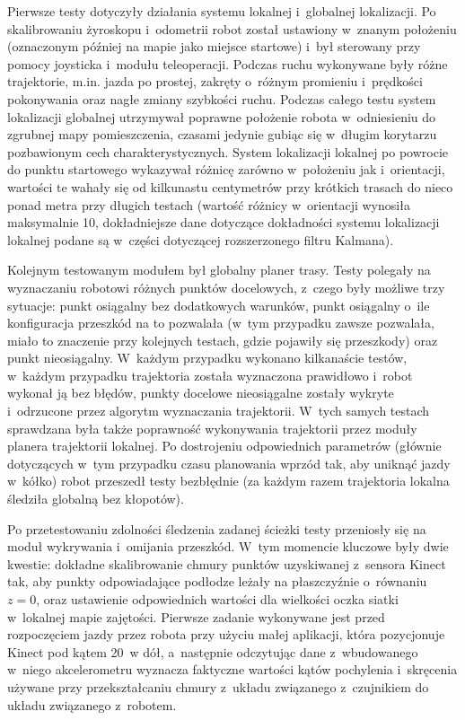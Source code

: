 Pierwsze testy dotyczyły działania systemu lokalnej i~globalnej lokalizacji.
Po skalibrowaniu żyroskopu i~odometrii robot został ustawiony w~znanym położeniu
(oznaczonym później na mapie jako miejsce startowe) i~był sterowany przy pomocy
joysticka i~modułu teleoperacji. Podczas ruchu wykonywane były różne trajektorie,
m.in. jazda po prostej, zakręty o~różnym promieniu i~prędkości pokonywania
oraz nagłe zmiany szybkości ruchu. Podczas całego testu system lokalizacji 
globalnej utrzymywał poprawne położenie robota w~odniesieniu do zgrubnej mapy 
pomieszczenia, czasami jedynie gubiąc się w~długim korytarzu pozbawionym 
cech charakterystycznych. System lokalizacji lokalnej po powrocie do punktu 
startowego wykazywał różnicę zarówno w~położeniu jak i~orientacji, wartości
te wahały się od kilkunastu centymetrów przy krótkich trasach do nieco ponad
metra przy długich testach (wartość różnicy w~orientacji wynosiła maksymalnie 10\textdegree,
dokładniejsze dane dotyczące dokładności systemu lokalizacji lokalnej podane
są w~części dotyczącej rozszerzonego filtru Kalmana).

Kolejnym testowanym modułem był globalny planer trasy. Testy polegały na 
wyznaczaniu robotowi różnych punktów docelowych, z~czego były możliwe 
trzy sytuacje: punkt osiągalny bez dodatkowych warunków, punkt osiągalny 
o~ile konfiguracja przeszkód na to pozwalała (w~tym przypadku zawsze pozwalała, 
miało to znaczenie przy kolejnych testach, gdzie pojawiły się przeszkody) 
oraz punkt nieosiągalny. W~każdym przypadku wykonano kilkanaście testów,
w~każdym przypadku trajektoria została wyznaczona prawidłowo i~robot wykonał
ją bez błędów, punkty docelowe nieosiągalne zostały wykryte i~odrzucone przez 
algorytm wyznaczania trajektorii. W~tych samych testach sprawdzana była także
poprawność wykonywania trajektorii przez moduły planera trajektorii lokalnej.
Po dostrojeniu odpowiednich parametrów (głównie dotyczących w~tym przypadku
czasu planowania wprzód tak, aby uniknąć jazdy w~kółko) robot przeszedł
testy bezbłędnie (za każdym razem trajektoria lokalna śledziła globalną 
bez kłopotów). 

Po przetestowaniu zdolności śledzenia zadanej ścieżki testy przeniosły się
na moduł wykrywania i~omijania przeszkód. W~tym momencie kluczowe były dwie
kwestie: dokładne skalibrowanie chmury punktów uzyskiwanej z~sensora Kinect
tak, aby punkty odpowiadające podłodze leżały na płaszczyźnie o~równaniu
$z=0$, oraz ustawienie odpowiednich wartości dla wielkości oczka siatki
w~lokalnej mapie zajętości. Pierwsze zadanie wykonywane jest przed rozpoczęciem
jazdy przez robota przy użyciu małej aplikacji, która pozycjonuje Kinect 
pod kątem 20\textdegree ~w dół, a~następnie odczytując dane z~wbudowanego 
w~niego akcelerometru wyznacza faktyczne wartości kątów pochylenia i~skręcenia
używane przy przekształcaniu chmury z~układu związanego z~czujnikiem do układu
związanego z~robotem. 


